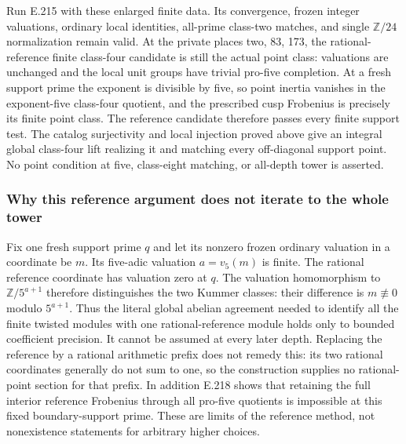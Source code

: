 Run E.215 with these enlarged finite data. Its convergence, frozen
integer valuations, ordinary local identities, all-prime class-two
matches, and single $\mathbb Z/24$ normalization remain valid. At the
private places two, 83, 173, the rational-reference finite class-four
candidate is still the actual point class: valuations are unchanged
and the local unit groups have trivial pro-five completion. At a fresh
support prime the exponent is divisible by five, so point inertia
vanishes in the exponent-five class-four quotient, and the prescribed
cusp Frobenius is precisely its finite point class. The reference
candidate therefore passes every finite support test. The catalog
surjectivity and local injection proved above give an integral global
class-four lift realizing it and matching every off-diagonal support
point. No point condition at five, class-eight matching, or all-depth
tower is asserted.

\subsubsection*{Why this reference argument does not iterate to the whole tower}
Fix one fresh support prime $q$ and let its nonzero frozen ordinary
valuation in a coordinate be $m$. Its five-adic valuation $a=v_5(m)$
is finite. The rational reference coordinate has valuation zero at $q$.
The valuation homomorphism to $\mathbb Z/5^{a+1}$ therefore distinguishes
the two Kummer classes: their difference is $m\not\equiv0$ modulo
$5^{a+1}$. Thus the literal global abelian agreement needed to identify
all the finite twisted modules with one rational-reference module holds
only to bounded coefficient precision. It cannot be assumed at every
later depth. Replacing the reference by a rational arithmetic prefix
does not remedy this: its two rational coordinates generally do not
sum to one, so the construction supplies no rational-point section for
that prefix. In addition E.218 shows that retaining the full interior
reference Frobenius through all pro-five quotients is impossible at
this fixed boundary-support prime. These are limits of the reference
method, not nonexistence statements for arbitrary higher choices.
